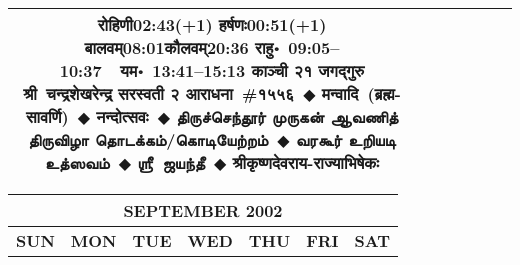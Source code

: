 \documentclass[a3paper,12pt,landscape]{article}
\newcommand{\eventsep}{~$\Diamondblack$ }
\newcommand{\To}{\hspace{1pt}\raisebox{0pt}{\tiny\RIGHTarrow}\hspace{1pt}}
\newcommand{\tamil}[1]{%
{\fontspec[Scale=0.9,FakeStretch=0.9]{Noto Sans Tamil} \footnotesize #1}}
\newcommand{\rahuyama}[2]{%
{राहु॰~\textsf{#1}~~यम॰~\textsf{#2}}
}
\begin{document}
\begin{center}
\begin{tabular}{|c|c|c|c|c|c|c|}
{{\mbox{रोहिणी\To{}\textsf{02:43(+1)\hspace{2ex}}}}%
{\mbox{हर्षणः\To{}\textsf{00:51(+1)\hspace{2ex}}}}%
{\mbox{बालवम्\To{}\textsf{08:01\hspace{2ex}}}\mbox{कौलवम्\To{}\textsf{20:36\hspace{2ex}}}}}%
{\rahuyama{09:05--10:37}{13:41--15:13}}%
{काञ्ची २१ जगद्गुरु श्री~चन्द्रशेखरेन्द्र सरस्वती २ आराधना~\#{१५५६}\eventsep मन्वादि~(ब्रह्म-सावर्णि)\eventsep नन्दोत्सवः\eventsep \tamil{திருச்செந்தூர் முருகன் ஆவணித் திருவிழா தொடக்கம்/கொடியேற்றம்}\eventsep \tamil{வரகூர் உறியடி உத்ஸவம்}\eventsep \tamil{ஶ்ரீ~ஜயந்தீ}\eventsep श्रीकृष्णदेवराय-राज्याभिषेकः}
\\ \hline %
\end{tabular}



\begin{tabular}{|c|c|c|c|c|c|c|}
\multicolumn{7}{c}{\Large \bfseries \sffamily SEPTEMBER 2002}\\[3mm]
\hline
\textbf{\textsf{SUN}} & \textbf{\textsf{MON}} & \textbf{\textsf{TUE}} & \textbf{\textsf{WED}} & \textbf{\textsf{THU}} & \textbf{\textsf{FRI}} & \textbf{\textsf{SAT}} \\ \hline


\end{tabular}
\end{center}
\end{document}
